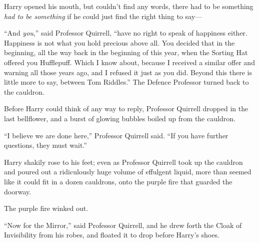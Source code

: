 Harry opened his mouth, but couldn’t find any words, there had to be something
\emph{had to be something} if he could just find the right thing to say—

“And \emph{you},” said Professor Quirrell, “have no right to speak of happiness
either. Happiness is not what you hold precious above all. You decided that in
the beginning, all the way back in the beginning of this year, when the Sorting
Hat offered you Hufflepuff. Which I know about, because I received a similar
offer and warning all those years ago, and I refused it just as you did. Beyond
this there is little more to say, between Tom Riddles.” The Defence Professor
turned back to the cauldron.

Before Harry could think of any way to reply, Professor Quirrell dropped in the
last bellflower, and a burst of glowing bubbles boiled up from the cauldron.

“I believe we are done here,” Professor Quirrell said. “If you have further
questions, they must wait.”

Harry shakily rose to his feet; even as Professor Quirrell took up the cauldron
and poured out a ridiculously huge volume of effulgent liquid, more than seemed
like it could fit in a dozen cauldrons, onto the purple fire that guarded the
doorway.

The purple fire winked out.

“Now for the Mirror,” said Professor Quirrell, and he drew forth the Cloak of
Invisibility from his robes, and floated it to drop before Harry’s shoes.
